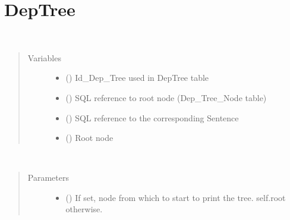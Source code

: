 \documentclass[letterpaper,10pt,english]{sphinxmanual}
\begin{document}
\section{DepTree}
\label{\detokenize{index:deptree}}

\begin{fulllineitems}
\label{\detokenize{index:loacore.classes.classes.DepTree}}~\begin{quote}\begin{description}
\item[{Variables}] \leavevmode\begin{itemize}
\item {} 
 () \textendash{} Id\_Dep\_Tree used in DepTree table

\item {} 
 () \textendash{} SQL reference to root node (Dep\_Tree\_Node table)

\item {} 
 () \textendash{} SQL reference to the corresponding Sentence

\item {} 
 ({\hyperref[\detokenize{index:loacore.classes.classes.DepTreeNode}]{}}) \textendash{} Root node

\end{itemize}

\end{description}\end{quote}

\begin{fulllineitems}
\label{\detokenize{index:loacore.classes.classes.DepTree.print_dep_tree}}~\begin{quote}\begin{description}
\item[{Parameters}] \leavevmode\begin{itemize}
\item {} 
 ({\hyperref[\detokenize{index:loacore.classes.classes.DepTreeNode}]{}}) \textendash{} If set, node from which to start to print the tree. self.root otherwise.


\end{itemize}
\end{description}
\end{quote}
\end{fulllineitems}
\end{fulllineitems}
\end{document}
